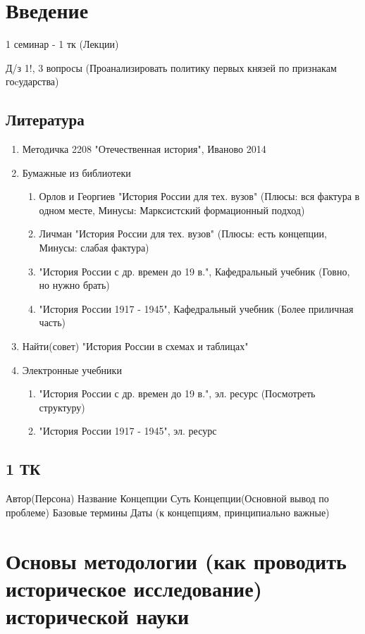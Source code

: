 \documentclass[a4paper]{article}
\begin{document}
\section{Введение}
1 семинар - 1 тк (Лекции)

Д/з 1!, 3 вопросы (Проанализировать политику первых князей по признакам гоcударства)

\subsection{Литература}
\begin{enumerate}
\item Методичка 2208
"Отечественная история", Иваново 2014
\item Бумажные из библиотеки
    \begin{enumerate}
    \item Орлов и Георгиев "История России для тех. вузов"
    (Плюсы: вся фактура в одном месте, Минусы: Марксистский формационный подход)
    \item Личман "История России для тех. вузов"
    (Плюсы: есть концепции, Минусы: слабая фактура)
    \item "История России с др. времен до 19 в.", Кафедральный учебник
    (Говно, но нужно брать)
    \item "История России 1917 - 1945", Кафедральный учебник
    (Более приличная часть)
    \end{enumerate}
\item Найти(совет) "История России в схемах и таблицах"
\item Электронные учебники
    \begin{enumerate}
    \item "История России с др. времен до 19 в.", эл. ресурс
    (Посмотреть структуру)
    \item "История России 1917 - 1945", эл. ресурс
    \end{enumerate}
\end{enumerate}

\subsection{1 ТК}

Автор(Персона)
Название Концепции
Суть Концепции(Основной вывод по проблеме)
Базовые термины
Даты (к концепциям, принципиально важные)

\section{Основы методологии (как проводить историческое исследование) исторической науки}
\end{document}
